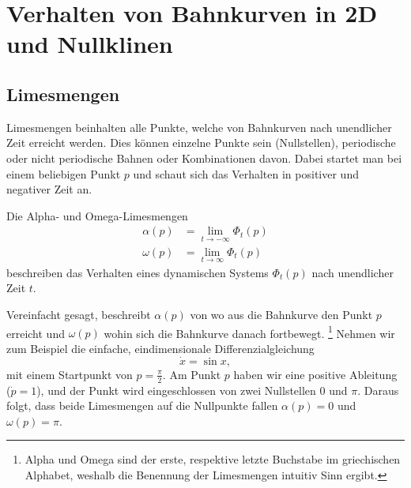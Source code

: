 \section{Verhalten von Bahnkurven in 2D und Nullklinen} \label{poinbendix:section:nullklinen}


\subsection{Limesmengen} \label{poinbendix:subsection:limesmengen}

Limesmengen beinhalten alle Punkte, welche von Bahnkurven nach unendlicher Zeit erreicht werden.
Dies können einzelne Punkte sein (Nullstellen), periodische oder nicht periodische Bahnen oder Kombinationen davon.
Dabei startet man bei einem beliebigen Punkt $p$ und schaut sich das Verhalten in positiver und negativer Zeit an.

\begin{definition}[Limesmengen]
Die Alpha- und Omega-Limesmengen
\label{poinbendix:def:limesmengen}
\begin{align*}
    \alpha(p) &= \lim_{t\to-\infty} \Phi_t(p) \\
    \omega(p) &= \lim_{t\to\infty} \Phi_t(p)
\end{align*}
beschreiben das Verhalten eines dynamischen Systems $\Phi_t(p)$ nach unendlicher Zeit $t$.
\end{definition}

Vereinfacht gesagt, beschreibt $\alpha(p)$ von wo aus die Bahnkurve den Punkt $p$ erreicht und $\omega(p)$ wohin sich die Bahnkurve danach fortbewegt.
\footnote{Alpha und Omega sind der erste, respektive letzte Buchstabe im griechischen Alphabet, weshalb die Benennung der Limesmengen intuitiv Sinn ergibt.}
Nehmen wir zum Beispiel die einfache, eindimensionale Differenzialgleichung
\begin{equation*}
    \dot{x} = \sin x,
\end{equation*}
mit einem Startpunkt von $p = \frac{\pi}{2}$.
Am Punkt $p$ haben wir eine positive Ableitung ($\dot{p} = 1$), und der Punkt wird eingeschlossen von zwei Nullstellen $0$ und $\pi$.
Daraus folgt, dass beide Limesmengen auf die Nullpunkte fallen $\alpha(p) = 0$ und $\omega(p) = \pi$.
